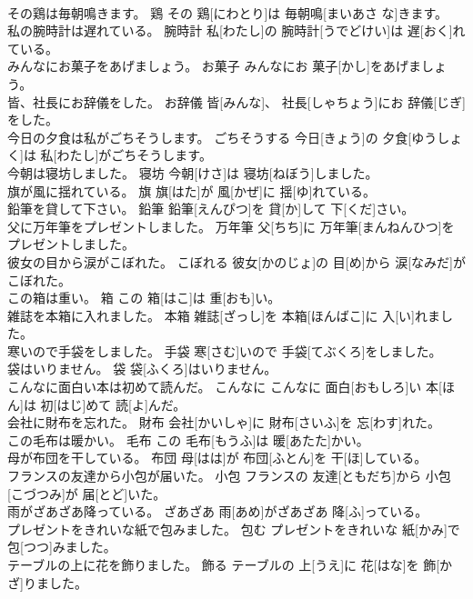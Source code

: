 \documentclass[8pt]{extreport}
\begin{document}
\begin{CJK}{UTF8}{min}
\\	その鶏は毎朝鳴きます。	鶏	その 鶏[にわとり]は 毎朝鳴[まいあさ な]きます。	
\\	私の腕時計は遅れている。	腕時計	私[わたし]の 腕時計[うでどけい]は 遅[おく]れている。	
\\	みんなにお菓子をあげましょう。	お菓子	みんなにお 菓子[かし]をあげましょう。	
\\	皆、社長にお辞儀をした。	お辞儀	皆[みんな]、 社長[しゃちょう]にお 辞儀[じぎ]をした。	
\\	今日の夕食は私がごちそうします。	ごちそうする	今日[きょう]の 夕食[ゆうしょく]は 私[わたし]がごちそうします。	
\\	今朝は寝坊しました。	寝坊	今朝[けさ]は 寝坊[ねぼう]しました。	
\\	旗が風に揺れている。	旗	旗[はた]が 風[かぜ]に 揺[ゆ]れている。	
\\	鉛筆を貸して下さい。	鉛筆	鉛筆[えんぴつ]を 貸[か]して 下[くだ]さい。	
\\	父に万年筆をプレゼントしました。	万年筆	父[ちち]に 万年筆[まんねんひつ]をプレゼントしました。	
\\	彼女の目から涙がこぼれた。	こぼれる	彼女[かのじょ]の 目[め]から 涙[なみだ]がこぼれた。	
\\	この箱は重い。	箱	この 箱[はこ]は 重[おも]い。	
\\	雑誌を本箱に入れました。	本箱	雑誌[ざっし]を 本箱[ほんばこ]に 入[い]れました。	
\\	寒いので手袋をしました。	手袋	寒[さむ]いので 手袋[てぶくろ]をしました。	
\\	袋はいりません。	袋	袋[ふくろ]はいりません。	
\\	こんなに面白い本は初めて読んだ。	こんなに	こんなに 面白[おもしろ]い 本[ほん]は 初[はじ]めて 読[よ]んだ。	
\\	会社に財布を忘れた。	財布	会社[かいしゃ]に 財布[さいふ]を 忘[わす]れた。	
\\	この毛布は暖かい。	毛布	この 毛布[もうふ]は 暖[あたた]かい。	
\\	母が布団を干している。	布団	母[はは]が 布団[ふとん]を 干[ほ]している。	
\\	フランスの友達から小包が届いた。	小包	フランスの 友達[ともだち]から 小包[こづつみ]が 届[とど]いた。	
\\	雨がざあざあ降っている。	ざあざあ	雨[あめ]がざあざあ 降[ふ]っている。	
\\	プレゼントをきれいな紙で包みました。	包む	プレゼントをきれいな 紙[かみ]で 包[つつ]みました。	
\\	テーブルの上に花を飾りました。	飾る	テーブルの 上[うえ]に 花[はな]を 飾[かざ]りました。	

\end{CJK}
\end{document}
